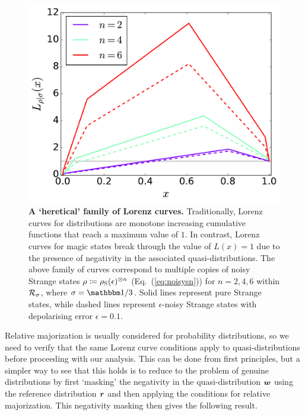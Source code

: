 \documentclass[pra,
aps,
twocolumn,
superscriptaddress,
groupedaddress,
nofootinbib,
reprint
]{revtex4-1}
\begin{document}
\begin{figure}
    \centering
    \includegraphics[scale=0.35]{figs/lc_strange.pdf}
    \caption{\textbf{A `heretical' family of Lorenz curves.} Traditionally, Lorenz curves for distributions are monotone increasing cumulative functions that reach a maximum value of $1$. In contrast, Lorenz curves for magic states break through the value of $L(x)=1$ due to the presence of negativity in the associated quasi-distributions. The above family of curves correspond to multiple copies of noisy Strange states $\rho\coloneqq\rho_{\rm{S}}(\epsilon)^{\otimes n}$ (Eq.~(\ref{eq:noisysn})) for $n=2,4,6$ within ${\mathcal R}_{\sigma}$, where $\sigma = \id/3$. Solid lines represent pure Strange states, while dashed lines represent $\epsilon$-noisy Strange states with depolarising error $\epsilon = 0.1$.
    }
    \label{fig:lcs}
\end{figure}

Relative majorization is usually considered for probability distributions, so we need to verify that the same Lorenz curve conditions apply to quasi-distributions before proceeding with our analysis. This can be done from first principles, but a simpler way to see that this holds is to reduce to the problem of genuine distributions by first `masking' the negativity in the quasi-distribution $\boldsymbol{w}$ using the reference distribution $\boldsymbol{r}$ and then applying the conditions for relative majorization. This negativity masking then gives the following result.
\end{document}

